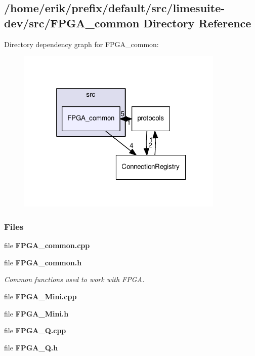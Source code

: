 \subsection{/home/erik/prefix/default/src/limesuite-\/dev/src/\+F\+P\+G\+A\+\_\+common Directory Reference}
\label{dir_26e685eace0ab600c064841a82f17458}
Directory dependency graph for F\+P\+G\+A\+\_\+common\+:
\nopagebreak
\begin{figure}[H]
\begin{center}
\leavevmode
\includegraphics[width=280pt]{dir_26e685eace0ab600c064841a82f17458_dep}
\end{center}
\end{figure}
\subsubsection*{Files}
\begin{DoxyCompactItemize}
\item 
file {\bf F\+P\+G\+A\+\_\+common.\+cpp}
\item 
file {\bf F\+P\+G\+A\+\_\+common.\+h}
\begin{DoxyCompactList}\small\item\em Common functions used to work with F\+P\+GA. \end{DoxyCompactList}\item 
file {\bf F\+P\+G\+A\+\_\+\+Mini.\+cpp}
\item 
file {\bf F\+P\+G\+A\+\_\+\+Mini.\+h}
\item 
file {\bf F\+P\+G\+A\+\_\+\+Q.\+cpp}
\item 
file {\bf F\+P\+G\+A\+\_\+\+Q.\+h}
\end{DoxyCompactItemize}
